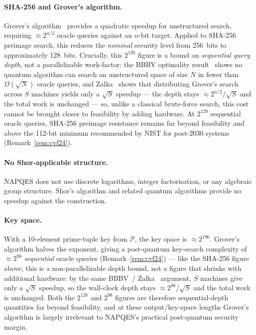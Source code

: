 \documentclass[11pt,a4paper]{article}
\begin{document}
\paragraph{SHA-256 and Grover's algorithm.}
Grover's algorithm~\cite{grover96} provides a quadratic speedup for
unstructured search, requiring $\approx 2^{n/2}$ oracle queries against an
$n$-bit target. Applied to SHA-256 preimage search, this reduces the
\emph{nominal} security level from 256~bits to approximately 128~bits.
Crucially, this $2^{128}$ figure is a bound on \emph{sequential query
depth}, not a parallelizable work-factor: the BBBV optimality
result~\cite{bbbv1997} shows no quantum algorithm can search an
unstructured space of size $N$ in fewer than $\Omega(\sqrt{N})$ oracle
queries, and Zalka~\cite{zalka1999} shows that distributing Grover's
search across $S$ machines yields only a $\sqrt{S}$ speedup --- the depth
stays $\approx 2^{n/2}/\sqrt{S}$ and the total work is unchanged --- so,
unlike a classical brute-force search, this cost cannot be brought closer
to feasibility by adding hardware. At $2^{128}$ sequential oracle queries,
SHA-256 preimage resistance remains far beyond feasibility and above the
112-bit minimum recommended by NIST for post-2030 systems
(Remark~\ref{rem:cvf24}).

\paragraph{No Shor-applicable structure.}
NAPQES does not use discrete logarithms, integer factorisation, or any
algebraic group structure.  Shor's algorithm and related quantum algorithms
provide no speedup against the construction.

\paragraph{Key space.}
With a 10-element prime-tuple key from $\mathcal{P}$, the key space is
$\approx 2^{196}$.  Grover's algorithm halves the exponent, giving a
post-quantum key-search complexity of $\approx 2^{98}$ \emph{sequential}
oracle queries (Remark~\ref{rem:cvf24}) --- like the SHA-256 figure
above, this is a non-parallelizable depth bound, not a figure that
shrinks with additional hardware: by the same BBBV~\cite{bbbv1997}/
Zalka~\cite{zalka1999} argument, $S$ machines give only a $\sqrt{S}$
speedup, so the wall-clock depth stays $\approx 2^{98}/\sqrt{S}$ and the
total work is unchanged. Both the $2^{128}$ and $2^{98}$ figures are
therefore sequential-depth quantities far beyond feasibility, and at
these output/key-space lengths Grover's algorithm is largely irrelevant
to NAPQES's practical post-quantum security margin.
\end{document}
